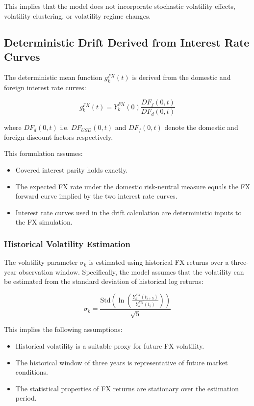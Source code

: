 This implies that the model does not incorporate stochastic volatility effects, volatility clustering, or volatility regime changes.

\subsection{Deterministic Drift Derived from Interest Rate Curves}

The deterministic mean function $g_k^{FX}(t)$ is derived from the domestic and foreign interest rate curves:

\begin{equation}
	g_k^{FX}(t)
	=
	Y_k^{FX}(0)
	\frac{DF_f(0,t)}{DF_d(0,t)}
\end{equation}

where $DF_d(0,t)$ i.e. $DF_{USD}(0,t)$ and $DF_f(0,t)$ denote the domestic and foreign discount factors respectively.

This formulation assumes:

\begin{itemize}
	\item Covered interest parity holds exactly.
	\item The expected FX rate under the domestic risk-neutral measure equals the FX forward curve implied by the two interest rate curves.
	\item Interest rate curves used in the drift calculation are deterministic inputs to the FX simulation.
\end{itemize}

\subsubsection{Historical Volatility Estimation}

The volatility parameter $\sigma_k$ is estimated using historical FX returns over a three-year observation window. 
Specifically, the model assumes that the volatility can be estimated from the standard deviation of historical log returns:

\begin{equation}
	\sigma_k
	=
	\frac{\text{Std}\left(
		\ln\left(\frac{Y_k^{FX}(t_{i+5})}{Y_k^{FX}(t_i)}\right)
		\right)}{\sqrt{5}}
\end{equation}

This implies the following assumptions:

\begin{itemize}
	\item Historical volatility is a suitable proxy for future FX volatility.
	\item The historical window of three years is representative of future market conditions.
	\item The statistical properties of FX returns are stationary over the estimation period.
\end{itemize}

